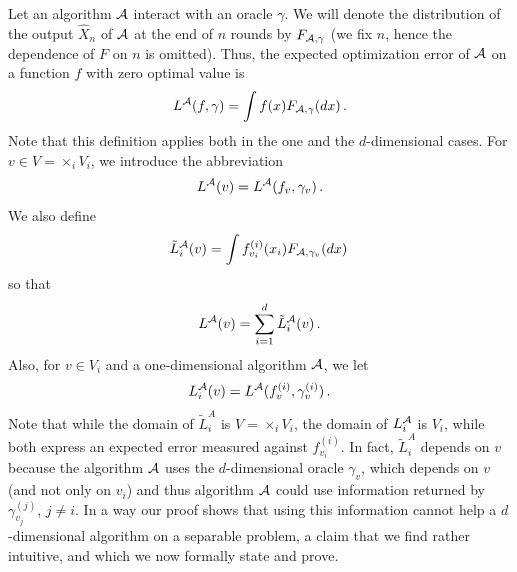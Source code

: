 Let an algorithm $\mathcal{A}$ interact with an oracle $\gamma$.
We will denote the distribution of the output $\hat{X}_n$ of $\mathcal{A}$
at the end of $n$ rounds by $F_{\mathcal{A},\gamma}$ 
(we fix $n$, hence the dependence of $F$ on $n$ is omitted).
Thus, the expected optimization error of $\mathcal{A}$ on a function $f$ with zero optimal value is 
\begin{align*}
L^{\mathcal{A}}(f,\gamma) = \int f(x) F_{\mathcal{A},\gamma}(d x)\,.
\end{align*}
Note that this definition applies both in the one and the $d$-dimensional cases.
For $v\in V = \times_i V_i$, we introduce the abbreviation
\begin{align*}
L^{\mathcal{A}}(v) = L^{\mathcal{A}}(f_v,\gamma_v)\,.
\end{align*}
We also define
\newcommand{\tL}{\tilde{L}}
\begin{align*}
\tL^{\A}_i(v) = \int f_{v_i}^{(i)}( x_i ) F_{\A,\gamma_v}(d x)\,
\end{align*}
so that 
\begin{align*}
L^{\A}(v) = \sum_{i=1}^d \tL^{\A}_i(v)\,.
\end{align*}
Also, for $v\in V_i$ and a one-dimensional algorithm $\mathcal{A}$, we let
\begin{align*}
L^{\mathcal{A}}_i(v) = L^{\mathcal{A}}(f_{v}^{(i)}, \gamma_{v}^{(i)})\,.
\end{align*}
Note that while the domain of $\tL^{A}_i$ is $V = \times_i V_i$, the domain of $L^{\mathcal{A}}_i$ is $V_i$,
while both express an expected error measured against $f_{v_i}^{(i)}$.
In fact,  $\tL^{A}_i$ depends on $v$ because the algorithm $\mathcal{A}$ uses the $d$-dimensional oracle $\gamma_v$, which depends on $v$ (and not only on $v_i$) and thus algorithm $\mathcal{A}$ could use information returned by $\gamma_{v_j}^{(j)}$, $j\ne i$. In a way our proof shows that using this information cannot help a $d$-dimensional algorithm on a separable problem, a claim that we find rather intuitive, and which we now formally state and prove.

